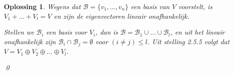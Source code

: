 \documentclass[a4paper,12pt]{article}
\newtheorem{oplossing}{Oplossing}
\begin{document}
\begin{enumerate}
\begin{oplossing}
        Wegens dat \(\mathcal{B} = \{v_1, \dots , v_n\}\) een basis van \(V\) voorstelt, is \(V_1 + \dots + V_l = V\) en zijn de eigenvectoren lineair onafhankelijk.
        
        Stellen we \(\mathcal{B}_i\) een basis voor \(V_i\), dan is \(\mathcal{B} = \mathcal{B}_1 \cup \dots \cup \mathcal{B}_l\),
        en uit het lineair onafhankelijk zijn \(\mathcal{B}_i \cap \mathcal{B}_j = \emptyset\) voor \((i\neq j )\le l\).
        Uit stelling 2.5.5 volgt dat \(V = V_{1}\oplus V_{2}\oplus \dots \oplus V_{l}\).
        
        \qed
    \end{oplossing}
\end{enumerate}

\vspace{0.5cm}
\end{document}
